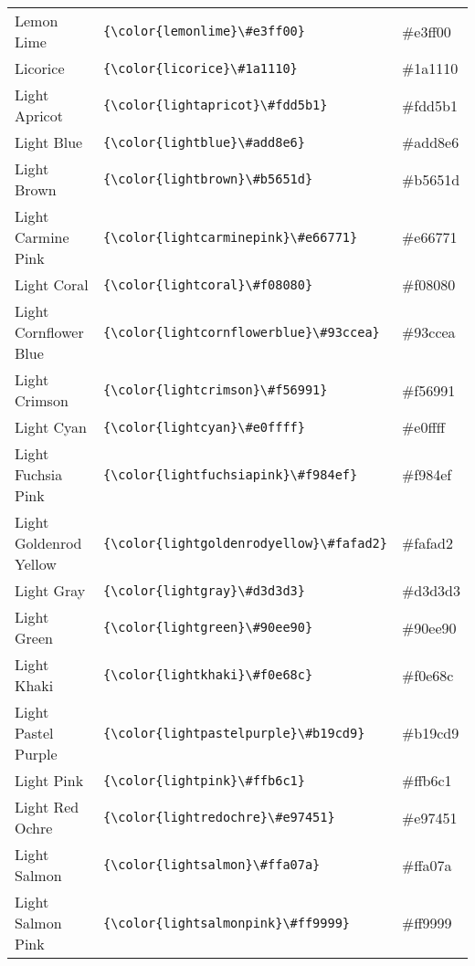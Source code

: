 \documentclass[9.5pt]{article}
\begin{document}
\begin{longtable}{l | l | l}
	Lemon Lime & \verb!{\color{lemonlime}\#e3ff00}! & {\color{lemonlime}\#e3ff00}\\
	Licorice & \verb!{\color{licorice}\#1a1110}! & {\color{licorice}\#1a1110}\\
	Light Apricot & \verb!{\color{lightapricot}\#fdd5b1}! & {\color{lightapricot}\#fdd5b1}\\
	Light Blue & \verb!{\color{lightblue}\#add8e6}! & {\color{lightblue}\#add8e6}\\
	Light Brown & \verb!{\color{lightbrown}\#b5651d}! & {\color{lightbrown}\#b5651d}\\
	Light Carmine Pink & \verb!{\color{lightcarminepink}\#e66771}! & {\color{lightcarminepink}\#e66771}\\
	Light Coral & \verb!{\color{lightcoral}\#f08080}! & {\color{lightcoral}\#f08080}\\
	Light Cornflower Blue & \verb!{\color{lightcornflowerblue}\#93ccea}! & {\color{lightcornflowerblue}\#93ccea}\\
	Light Crimson & \verb!{\color{lightcrimson}\#f56991}! & {\color{lightcrimson}\#f56991}\\
	Light Cyan & \verb!{\color{lightcyan}\#e0ffff}! & {\color{lightcyan}\#e0ffff}\\
	Light Fuchsia Pink & \verb!{\color{lightfuchsiapink}\#f984ef}! & {\color{lightfuchsiapink}\#f984ef}\\
	Light Goldenrod Yellow & \verb!{\color{lightgoldenrodyellow}\#fafad2}! & {\color{lightgoldenrodyellow}\#fafad2}\\
	Light Gray & \verb!{\color{lightgray}\#d3d3d3}! & {\color{lightgray}\#d3d3d3}\\
	Light Green & \verb!{\color{lightgreen}\#90ee90}! & {\color{lightgreen}\#90ee90}\\
	Light Khaki & \verb!{\color{lightkhaki}\#f0e68c}! & {\color{lightkhaki}\#f0e68c}\\
	Light Pastel Purple & \verb!{\color{lightpastelpurple}\#b19cd9}! & {\color{lightpastelpurple}\#b19cd9}\\
	Light Pink & \verb!{\color{lightpink}\#ffb6c1}! & {\color{lightpink}\#ffb6c1}\\
	Light Red Ochre & \verb!{\color{lightredochre}\#e97451}! & {\color{lightredochre}\#e97451}\\
	Light Salmon & \verb!{\color{lightsalmon}\#ffa07a}! & {\color{lightsalmon}\#ffa07a}\\
	Light Salmon Pink & \verb!{\color{lightsalmonpink}\#ff9999}! & {\color{lightsalmonpink}\#ff9999}\\

\end{longtable}
\end{document}
